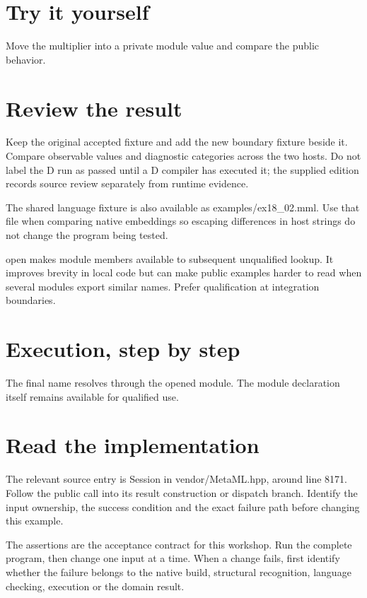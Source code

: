 \section*{Try it yourself}
Move the multiplier into a private module value and compare the public behavior.

\section*{Review the result}
Keep the original accepted fixture and add the new boundary fixture beside it. Compare observable values and diagnostic categories across the two hosts. Do not label the D run as passed until a D compiler has executed it; the supplied edition records source review separately from runtime evidence.

The shared language fixture is also available as examples/ex18\_02.mml. Use that file when comparing native embeddings so escaping differences in host strings do not change the program being tested.

\clearpage
{}
open makes module members available to subsequent unqualified lookup. It improves brevity in local code but can make public examples harder to read when several modules export similar names. Prefer qualification at integration boundaries.


\section*{Execution, step by step}
The final name resolves through the opened module. The module declaration itself remains available for qualified use.

\section*{Read the implementation}
The relevant source entry is Session in vendor/MetaML.hpp, around line 8171. Follow the public call into its result construction or dispatch branch. Identify the input ownership, the success condition and the exact failure path before changing this example.

The assertions are the acceptance contract for this workshop. Run the complete program, then change one input at a time. When a change fails, first identify whether the failure belongs to the native build, structural recognition, language checking, execution or the domain result.

